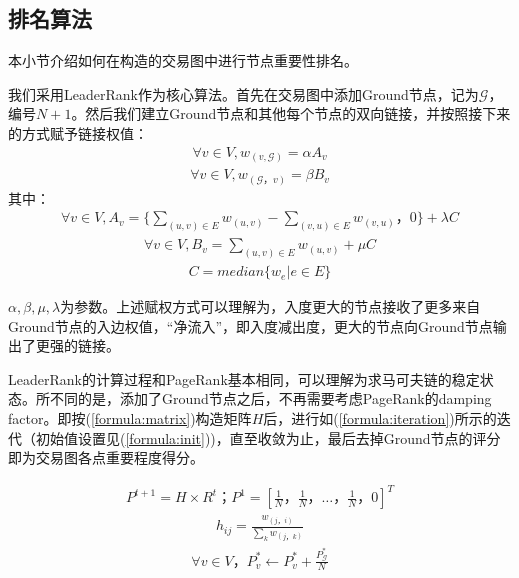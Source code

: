 \subsection{排名算法} \label{subsec:leaderrank}
本小节介绍如何在构造的交易图中进行节点重要性排名。

我们采用LeaderRank\cite{Chen2013}\cite{Li2014}作为核心算法。首先在交易图中添加Ground节点，记为$\mathcal{G}$，编号$N+1$。然后我们建立Ground节点和其他每个节点的双向链接，并按照接下来的方式赋予链接权值：
\begin{align}\label{formula:weight1}
	\forall v \in V, w_{(v, \mathcal{G})} = \alpha A_v
\end{align}
\begin{align}\label{formula:weight2}
\forall v \in V,  w_{(\mathcal{G}， v)} = \beta B_v
\end{align}
其中：
\begin{align}
	\forall v \in V, A_v = \{ \sum_{(u,v)\in E} w_{(u,v)} - \sum_{(v,u) \in E} w_{(v, u)}， 0 \} + \lambda C
\end{align}
\begin{align} \label{formula:b}
\forall v \in V,  B_v =  \sum_{(u,v) \in E} w_{(u,v)} + \mu C
\end{align}
\begin{align}
	C = median\{w_e| e \in E\}
\end{align}

$\alpha, \beta, \mu, \lambda$为参数。上述赋权方式可以理解为，入度更大的节点接收了更多来自Ground节点的入边权值，“净流入”，即入度减出度，更大的节点向Ground节点输出了更强的链接。

LeaderRank的计算过程和PageRank基本相同，可以理解为求马可夫链的稳定状态。所不同的是，添加了Ground节点之后，不再需要考虑PageRank的damping factor\cite{Brin2010}\cite{page1999pagerank}。即按(\ref{formula:matrix})构造矩阵$H$后，进行如(\ref{formula:iteration})所示的迭代（初始值设置见(\ref{formula:init}))，直至收敛为止，最后去掉Ground节点的评分即为交易图各点重要程度得分。

\begin{align} \label{formula:iteration}
	P^{t+1} = H \times R^{t}； P^1=[\frac{1}{N}， \frac{1}{N}， \dots， \frac{1}{N}， 0]^T
\end{align}
\begin{align} \label{formula:matrix}
	h_{ij} = \frac{w_{(j，i)}}{\sum_k w_{(j，k)}}
\end{align}
\begin{align} \label{formula:init}
\forall v \in V， P^*_v \leftarrow P^*_v + \frac{P^*_{\mathcal{G}}}{N}
\end{align}


